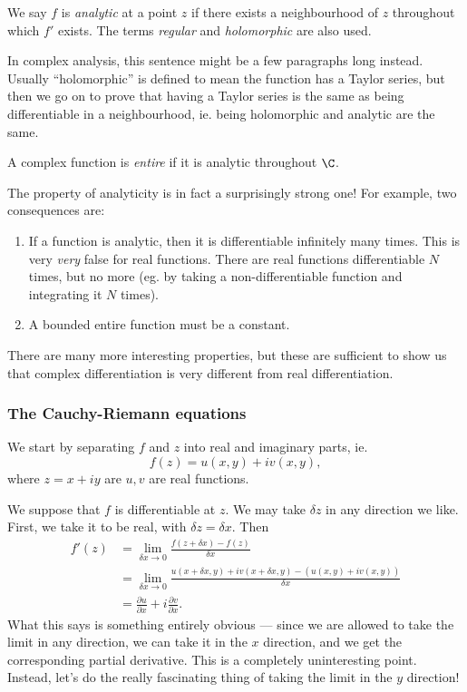\documentclass[a4paper]{article}
\begin{document}
\begin{defi}
  We say $f$ is \emph{analytic} at a point $z$ if there exists a neighbourhood of $z$ throughout which $f'$ exists. The terms \emph{regular} and \emph{holomorphic} are also used.
\end{defi}
In complex analysis, this sentence might be a few paragraphs long instead. Usually ``holomorphic'' is defined to mean the function has a Taylor series, but then we go on to prove that having a Taylor series is the same as being differentiable in a neighbourhood, ie. being holomorphic and analytic are the same.

\begin{defi}
  A complex function is \emph{entire} if it is analytic throughout $\C$.
\end{defi}

The property of analyticity is in fact a surprisingly strong one! For example, two consequences are:
\begin{enumerate}
  \item If a function is analytic, then it is differentiable infinitely many times. This is very \emph{very} false for real functions. There are real functions differentiable $N$ times, but no more (eg. by taking a non-differentiable function and integrating it $N$ times).
  \item A bounded entire function must be a constant.
\end{enumerate}
There are many more interesting properties, but these are sufficient to show us that complex differentiation is very different from real differentiation.
\subsubsection*{The Cauchy-Riemann equations}
We start by separating $f$ and $z$ into real and imaginary parts, ie.
\[
  f(z) = u(x, y) + iv(x, y),
\]
where $z = x + iy$ are $u, v$ are real functions.

We suppose that $f$ is differentiable at $z$. We may take $\delta z$ in any direction we like. First, we take it to be real, with $\delta z = \delta x$. Then
\begin{align*}
  f'(z) &= \lim_{\delta x \to 0} \frac{f(z + \delta x) - f(z)}{\delta x}\\
  &= \lim_{\delta x \to 0} \frac{u(x + \delta x, y) + iv(x + \delta x, y) - (u(x, y) + iv(x, y))}{\delta x}\\
  &= \frac{\partial u}{\partial x} + i \frac{\partial v}{\partial x}.
\end{align*}
What this says is something entirely obvious --- since we are allowed to take the limit in any direction, we can take it in the $x$ direction, and we get the corresponding partial derivative. This is a completely uninteresting point. Instead, let's do the really fascinating thing of taking the limit in the $y$ direction!
\end{document}
